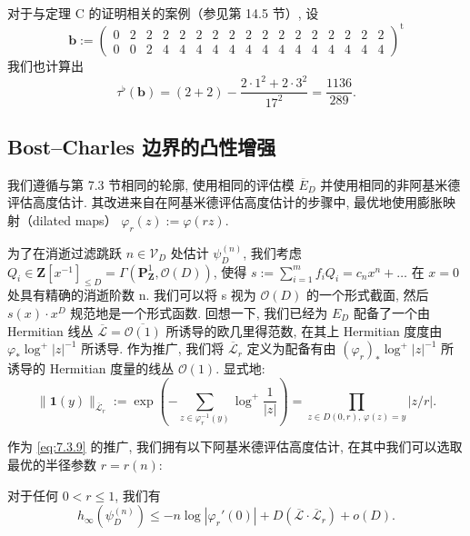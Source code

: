 \begin{example}\label{ex:7.3.20}
对于与定理 C 的证明相关的案例（参见第 14.5 节）, 设
\begin{equation*}
\mathbf{b} := \begin{pmatrix}
0 & 2 & 2 & 2 & 2 & 2 & 2 & 2 & 2 & 2 & 2 & 2 & 2 & 2 & 2 & 2 & 2 \\
0 & 0 & 2 & 4 & 4 & 4 & 4 & 4 & 4 & 4 & 4 & 4 & 4 & 4 & 4 & 4 & 4
\end{pmatrix}^{\mathrm{t}}
\end{equation*}
我们也计算出
\[ \tau^{\flat}(\mathbf{b}) = (2+2) - \frac{2 \cdot 1^2 + 2 \cdot 3^2}{17^2} = \frac{1136}{289}. \]
\end{example}

\subsection{Bost--Charles 边界的凸性增强}\label{sec:7.4}

我们遵循与第 7.3 节相同的轮廓, 使用相同的评估模 \(\overline{E}_D\) 并使用相同的非阿基米德评估高度估计. 
其改进来自在阿基米德评估高度估计的步骤中, 最优地使用膨胀映射（dilated maps） \(\varphi_r(z) := \varphi(rz)\).

为了在消逝过滤跳跃 \(n \in \mathcal{V}_D\) 处估计 \(\psi_D^{(n)}\), 
我们考虑 \(Q_i \in \mathbf{Z}[x^{-1}]_{\leq D} = \Gamma(\mathbf{P}_{\mathbf{Z}}^1, \mathcal{O}(D))\), 
使得 \(s := \sum_{i=1}^m f_i Q_i = c_n x^n + \ldots\) 在 \(x = 0\) 处具有精确的消逝阶数 n. 
我们可以将 s 视为 \(\mathcal{O}(D)\) 的一个形式截面, 
然后 \(s(x) \cdot x^D\) 规范地是一个形式函数. 
回想一下, 我们已经为 \(E_D\) 配备了一个由 Hermitian 线丛 \(\overline{\mathcal{L}} = \overline{\mathcal{O}(1)}\) 所诱导的欧几里得范数, 
在其上 Hermitian 度度由 \(\varphi_* \log^+ |z|^{-1}\) 所诱导. 
作为推广, 我们将 \(\overline{\mathcal{L}}_r\) 定义为配备有由 \((\varphi_r)_* \log^+ |z|^{-1}\) 所诱导的 Hermitian 度量的线丛 \(\mathcal{O}(1)\). 
显式地:
\[ \|\mathbf{1}(y)\|_{\overline{\mathcal{L}}_r} := \exp\left(-\sum_{z \in \varphi_r^{-1}(y)} \log^+ \frac{1}{|z|}\right) = \prod_{z \in D(0,r), \, \varphi(z) = y} |z/r|. \]

作为 \eqref{eq:7.3.9} 的推广, 我们拥有以下阿基米德评估高度估计, 在其中我们可以选取最优的半径参数 \(r = r(n)\):

\begin{lemma}\label{lem:7.4.1}
对于任何 \(0 < r \le 1\), 我们有
\[ h_{\infty}(\psi_D^{(n)}) \le -n \log |\varphi_r'(0)| + D(\overline{\mathcal{L}} \cdot \overline{\mathcal{L}}_r) + o(D). \]
\end{lemma}

